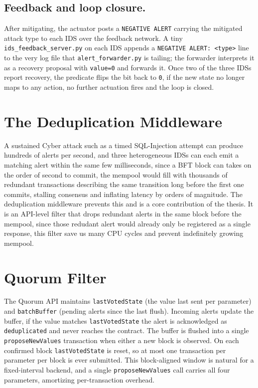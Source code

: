 \subsection{Feedback and loop closure.}
\label{subsec:feedback_closure}
After mitigating, the actuator posts a \texttt{NEGATIVE ALERT} carrying the mitigated attack type to each IDS over the feedback network. A tiny \texttt{ids\_feedback\_server.py} on each IDS appends a \texttt{NEGATIVE ALERT: <type>} line to the very log file that \texttt{alert\_forwarder.py} is tailing; the forwarder interprets it as a recovery proposal with \texttt{value=0} and forwards it. Once two of the three IDSs report recovery, the predicate flips the bit back to \texttt{0}, if the new state no longer maps to any action, no further actuation fires and the loop is closed.

\section{The Deduplication Middleware}
\label{sec:impl_dedup}

A sustained Cyber attack such as a timed SQL-Injection attempt can produce hundreds of alerts per second, and three heterogeneous IDSs can each emit a matching alert within the same few milliseconds, since a BFT block can takes on the order of second to commit, the mempool would fill with thousands of redundant transactions describing the same transition long before the first one commits, stalling consensus and inflating latency by orders of magnitude. The deduplication middleware prevents this and is a core contribution of the thesis. It is an API-level filter that drops redundant alerts in the same block before the mempool, since those redudant alert would already only be registered as a single response, this filter save us many CPU cycles and prevent indefinitely growing mempool.

\section{Quorum Filter}
The Quorum API maintains \texttt{lastVotedState} (the value last sent per parameter) and \texttt{batchBuffer} (pending alerts since the last flush). Incoming alerts update the buffer, if the value matches \texttt{lastVotedState} the alert is acknowledged as \texttt{deduplicated} and never reaches the contract. The buffer is flushed into a single \texttt{proposeNewValues} transaction when either a new block is observed. On each confirmed block \texttt{lastVotedState} is reset, so at most one transaction per parameter per block is ever submitted. This block-aligned window is natural for a fixed-interval backend, and a single \texttt{proposeNewValues} call carries all four parameters, amortizing per-transaction overhead.

